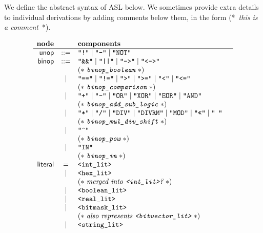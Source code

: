 \documentclass{book}
\begin{document}
\newcommand\ASTComment[1]{(*\ \textit{#1}\ *)}

We define the abstract syntax of ASL below. We sometimes provide extra details to individual derivations by adding comments below them, in the form \ASTComment{this is a comment}.

\[
\begin{array}{rcll}
\textbf{node} & & \textbf{components} \\
\hline
\unop &::=& \texttt{"!"} \;|\; \texttt{"-"} \;|\; \texttt{"NOT"} & \\
\binop &::=& \texttt{"\&\&"} \;|\; \texttt{"||"} \;|\; \texttt{"-->"} \;|\;  \texttt{"<->"}  \\
 & & \ASTComment{\texttt{binop\_boolean}}\\

 &|& \texttt{"=="} \;|\; \texttt{"!="}  \;|\; \texttt{">"}  \;|\; \texttt{">="} \;|\; \texttt{"<"} \;|\; \texttt{"<="}   \\
 & & \ASTComment{\texttt{binop\_comparison}}\\

 &|& \texttt{"+"} \;|\; \texttt{"-"}  \;|\; \texttt{"OR"}  \;|\; \texttt{"XOR"} \;|\; \texttt{"EOR"} \;|\; \texttt{"AND"}   \\
 & & \ASTComment{\texttt{binop\_add\_sub\_logic}}\\

 &|& \texttt{"*"} \;|\; \texttt{"/"}  \;|\; \texttt{"DIV"}  \;|\; \texttt{"DIVRM"} \;|\; \texttt{"MOD"}  \;|\; \texttt{"<<"}  \;|\; \texttt{"\>\>"}    \\
 & & \ASTComment{\texttt{binop\_mul\_div\_shift}}\\

 &|& \texttt{"\^{}"}   \\
 & & \ASTComment{\texttt{binop\_pow}}\\

 &|& \texttt{"IN"}   \\
 & & \ASTComment{\texttt{binop\_in}}\\

\literal &=& \texttt{<int\_lit>}  \\
 &|&\texttt{<hex\_lit>} \\
 & & \ASTComment{merged into \texttt{<int\_lit>}?}\\
 &|&\texttt{<boolean\_lit>}  \\
 &|& \texttt{<real\_lit>}  \\
 &|& \texttt{<bitmask\_lit>}   \\
 & & \ASTComment{also represents \texttt{<bitvector\_lit>}}\\
 &|&\texttt{<string\_lit>}
\end{array}
\]
\end{document}

